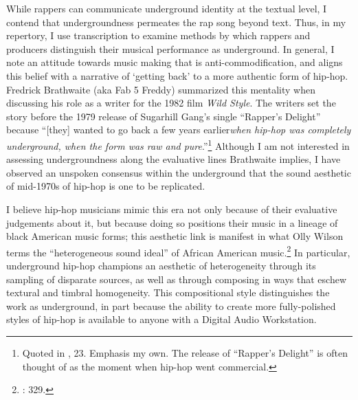 While rappers can communicate underground identity at the textual level, I contend that undergroundness
permeates the rap song beyond text. Thus, in my repertory, I use transcription to examine methods by which
rappers and producers distinguish their musical performance as underground. In general, I note an attitude
towards music making that is anti-commodification, and aligns this belief with a narrative of `getting 
back' to a more authentic form of hip-hop. Fredrick Brathwaite (aka Fab 5 Freddy) summarized this mentality
when discussing his role as a writer for the 1982 film \textit{Wild Style}. The writers set the story 
before the 1979 release of Sugarhill Gang's single ``Rapper's Delight'' because ``[they] wanted to go back
a few years earlier\textellipsis \emph{when hip-hop was completely underground, when the form was raw and
pure}.''\footnote{Quoted in \cite{justinawilliamsRhyminStealinMusical2013}, 23. Emphasis my own. The release
of ``Rapper's Delight'' is often thought of as the moment when hip-hop went commercial.} Although I am not
interested in assessing undergroundness along the evaluative lines Brathwaite implies, I have observed an
unspoken consensus within the underground that the sound aesthetic of mid-1970s of hip-hop is one to be
replicated.

I believe hip-hop musicians mimic this era not only because of their evaluative judgements about it, but
because doing so positions their music in a lineage of black American music forms; this aesthetic link is
manifest in what Olly Wilson terms the ``heterogeneous sound ideal'' of African American
music.\footnote{\cite{ollywilsonHeterogeneousSoundIdeal1992}: 329.} In particular, underground hip-hop
champions an aesthetic of heterogeneity through its sampling of disparate sources, as well as  through
composing in ways that eschew textural and timbral homogeneity. This compositional style distinguishes the
work as underground, in part because the ability to create more fully-polished styles of hip-hop is available
to anyone with a Digital Audio Workstation. 

